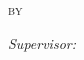 \begin{titlepage}
\begin{center}
		{\huge \bfseries \ttitle\par}\vspace{1cm} %



		\textsc{\Large by}\\[1cm]

		{\Large \authorname}

		\vspace{1.5cm}

		\emph{Supervisor:} \\
		\supname\\[1cm]

		\groupname%

		\vfill

		{\large \tdate} %





		\vfill
	\end{center}

	\restoregeometry

\end{titlepage}


